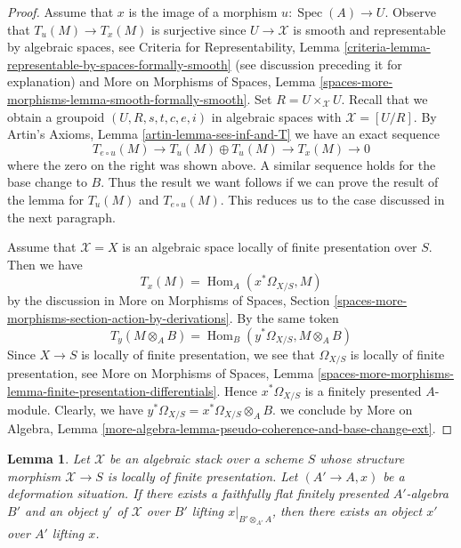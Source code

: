 \documentclass{stacks-project}
\theoremstyle{plain}
\newtheorem{lemma}[subsection]{Lemma}
\theoremstyle{definition}
\theoremstyle{remark}
\numberwithin{equation}{subsection}
\def\Spec{\mathop{\mathrm{Spec}}}
\def\Hom{\mathop{\mathrm{Hom}}\nolimits}
\begin{document}
\begin{proof}
\medskip\noindent
Assume that $x$ is the image of a morphism $u : \Spec(A) \to U$.
Observe that $T_u(M) \to T_x(M)$ is surjective since
$U \to \mathcal{X}$ is smooth and representable by
algebraic spaces, see Criteria for Representability, Lemma
\ref{criteria-lemma-representable-by-spaces-formally-smooth}
(see discussion preceding it for explanation) and
More on Morphisms of Spaces, Lemma
\ref{spaces-more-morphisms-lemma-smooth-formally-smooth}.
Set $R = U \times_\mathcal{X} U$. Recall that we obtain
a groupoid $(U, R, s, t, c, e, i)$ in algebraic spaces with
$\mathcal{X} = [U/R]$. By
Artin's Axioms, Lemma \ref{artin-lemma-ses-inf-and-T}
we have an exact sequence
$$
T_{e \circ u}(M) \to T_u(M) \oplus T_u(M) \to T_x(M) \to 0
$$
where the zero on the right was shown above. A similar sequence
holds for the base change to $B$. Thus the result we want follows if
we can prove the result of the lemma for
$T_u(M)$ and $T_{e \circ u}(M)$. This reduces us to the case discussed
in the next paragraph.

\medskip\noindent
Assume that $\mathcal{X} = X$ is an algebraic space locally of finite
presentation over $S$. Then we have
$$
T_x(M) = \Hom_A(x^*\Omega_{X/S}, M)
$$
by the discussion in More on Morphisms of Spaces, Section
\ref{spaces-more-morphisms-section-action-by-derivations}.
By the same token
$$
T_y(M \otimes_A B) = \Hom_B(y^*\Omega_{X/S}, M \otimes_A B)
$$
Since $X \to S$ is locally of finite presentation, we see that
$\Omega_{X/S}$ is locally of finite presentation, see
More on Morphisms of Spaces, Lemma
\ref{spaces-more-morphisms-lemma-finite-presentation-differentials}.
Hence $x^*\Omega_{X/S}$ is a finitely presented $A$-module.
Clearly, we have $y^*\Omega_{X/S} = x^*\Omega_{X/S} \otimes_A B$.
we conclude by More on Algebra, Lemma
\ref{more-algebra-lemma-pseudo-coherence-and-base-change-ext}.
\end{proof}

\begin{lemma}
\label{lemma-local-lift-enough}
Let $\mathcal{X}$ be an algebraic stack over a scheme $S$ whose
structure morphism $\mathcal{X} \to S$ is locally of finite presentation.
Let $(A' \to A, x)$ be a deformation situation. If there exists a
faithfully flat finitely presented $A'$-algebra $B'$ and an
object $y'$ of $\mathcal{X}$ over $B'$ lifting $x|_{B' \otimes_{A'} A}$,
then there exists an object $x'$ over $A'$ lifting $x$.
\end{lemma}
\end{document}
